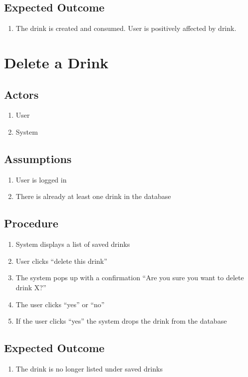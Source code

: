 {\subsection{Expected Outcome}
	\begin{enumerate}
    	\item The drink is created and consumed. User is positively affected by drink. 
    \end{enumerate}   
    
\section{Delete a Drink}
\subsection{Actors}
	\begin{enumerate}
    	\item User
    	\item System
    \end{enumerate}
\subsection{Assumptions}
	\begin{enumerate}
    	\item User is logged in
		\item There is already at least one drink in the database
	\end{enumerate}
\subsection{Procedure}
	\begin{enumerate}
    	\item System displays a list of saved drinks
    	\item User clicks ``delete this drink''
    	\item The system pops up with a confirmation ``Are you sure you want to delete drink X?''
    	\item The user clicks ``yes'' or ``no''
    	\item If the user clicks ``yes'' the system drops the drink from the database
    \end{enumerate}
\subsection{Expected Outcome}
	\begin{enumerate}
    	\item The drink is no longer listed under saved drinks
    \end{enumerate}

}
    